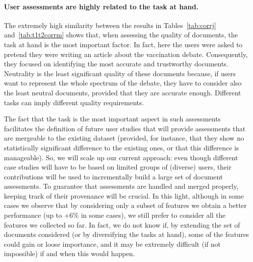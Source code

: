 \documentclass{llncs}
\begin{document}
\paragraph{{\bf User assessments are highly related to the task at hand.}}
The extremely high similarity between the results in Tables~\ref{tab:corrj} and~\ref{tab:t1t2corrm} shows that, when assessing the quality of documents, the task at hand is the most important factor. In fact, here the users were asked to pretend they were writing an article about the vaccination debate. Consequently, they focused on identifying the most accurate and trustworthy documents. Neutrality is the least significant quality of these documents because, if users want to represent the whole spectrum of the debate, they have to consider also the least neutral documents, provided that they are accurate enough. Different tasks can imply different quality requirements.

The fact that the task is the most important aspect in such assessments facilitates the definition of future user studies that will provide assessments that are mergeable to the existing dataset (provided, for instance, that they show no statistically significant difference to the existing ones, or that this difference is manageable). So, we will scale up our current approach: even though different case studies will have to be based on limited groups of (diverse) users, their contributions will be used to incrementally build a large set of document assessments. To guarantee that assessments are handled and merged properly, keeping track of their provenance will be crucial.
%
%
%
%
In this light, although in some cases we observe that by considering only a subset of features we obtain a better performance (up to +6\% in some cases), we still prefer to consider all the features we collected so far. In fact, we do not know if, by extending the set of documents considered (or by diversifying the tasks at hand), some of the features could gain or loose importance, and it may be extremely difficult (if not impossible) if and when this would happen.
%
%
%
\end{document}
